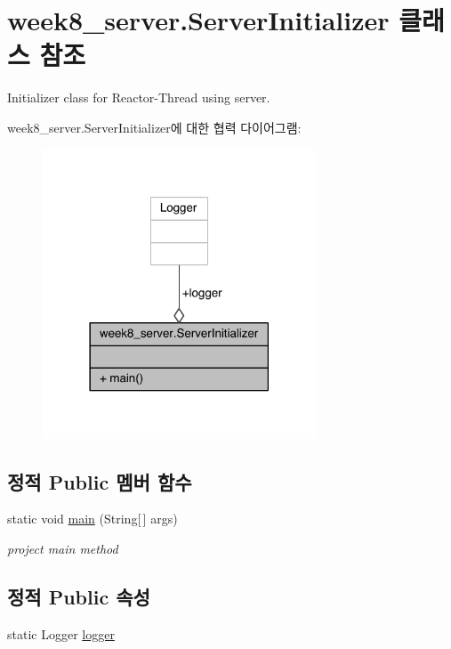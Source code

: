 \hypertarget{classweek8__server_1_1_server_initializer}{\section{week8\-\_\-server.\-Server\-Initializer 클래스 참조}
\label{classweek8__server_1_1_server_initializer}
}


Initializer class for Reactor-\/\-Thread using server.  




week8\-\_\-server.\-Server\-Initializer에 대한 협력 다이어그램\-:
\nopagebreak
\begin{figure}[H]
\begin{center}
\leavevmode
\includegraphics[width=230pt]{classweek8__server_1_1_server_initializer__coll__graph}
\end{center}
\end{figure}
\subsection*{정적 Public 멤버 함수}
\begin{DoxyCompactItemize}
\item 
static void \hyperlink{classweek8__server_1_1_server_initializer_a73b9694a5855a87335cbe63c96f8c8a9}{main} (String\mbox{[}$\,$\mbox{]} args)
\begin{DoxyCompactList}\small\item\em project main method \end{DoxyCompactList}\end{DoxyCompactItemize}
\subsection*{정적 Public 속성}
\begin{DoxyCompactItemize}
\item 
static Logger \hyperlink{classweek8__server_1_1_server_initializer_a93ccaaf656ba68e2dd3950bacc0e9b2e}{logger}
\end{DoxyCompactItemize}


